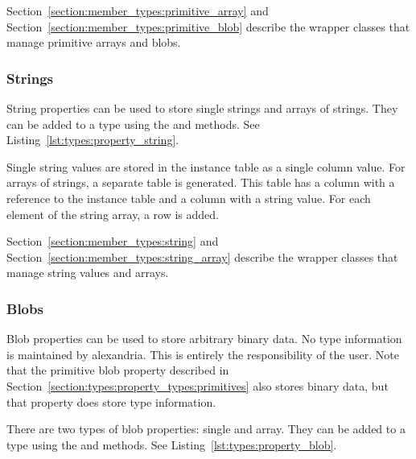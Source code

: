 

Section~\ref{section:member_types:primitive_array} and Section~\ref{section:member_types:primitive_blob} describe the wrapper classes that manage primitive arrays and blobs.

\subsubsection{Strings}
\label{section:types:property_types:strings}

String properties can be used to store single strings and arrays of strings. They can be added to a type using the  and  methods. See Listing~\ref{lst:types:property_string}.



Single string values are stored in the instance table as a single column value. For arrays of strings, a separate table is generated. This table has a column with a reference to the instance table and a column with a string value. For each element of the string array, a row is added.

Section~\ref{section:member_types:string} and Section~\ref{section:member_types:string_array} describe the wrapper classes that manage string values and arrays.

\subsubsection{Blobs}
\label{section:types:property_types:blobs}

Blob properties can be used to store arbitrary binary data. No type information is maintained by \gls{alexandria}. This is entirely the responsibility of the user. Note that the primitive blob property described in Section~\ref{section:types:property_types:primitives} also stores binary data, but that property does store type information.

There are two types of blob properties: single and array. They can be added to a type using the  and  methods. See Listing~\ref{lst:types:property_blob}.



